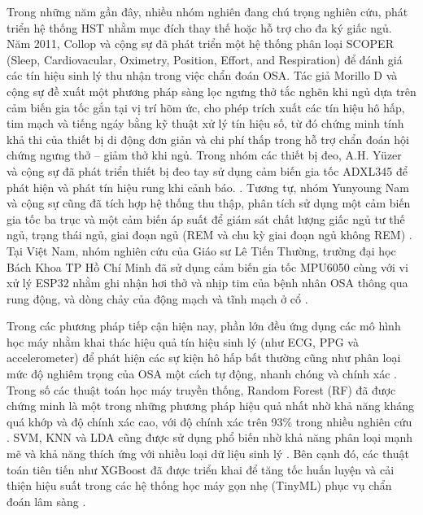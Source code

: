 Trong những năm gần đây, nhiều nhóm nghiên đang chú trọng nghiên cứu, phát
triển hệ thống HST nhằm mục đích thay thế hoặc hỗ trợ cho đa ký giấc ngủ. Năm
2011, Collop và cộng sự đã phát triển một hệ thống phân loại SCOPER (Sleep,
Cardiovacular, Oximetry, Position, Effort, and Respiration) để đánh giá các tín
hiệu sinh lý thu nhận trong việc chẩn đoán OSA\cite{hst_6p_paper}. Tác giả
Morillo D và cộng sự đề xuất một phương pháp sàng lọc ngưng thở tắc nghẽn khi
ngủ dựa trên cảm biến gia tốc gắn tại vị trí hõm ức, cho phép trích xuất các
tín hiệu hô hấp, tim mạch và tiếng ngáy bằng kỹ thuật xử lý tín hiệu số, từ đó
chứng minh tính khả thi của thiết bị di động đơn giản và chi phí thấp trong hỗ
trợ chẩn đoán hội chứng ngưng thở – giảm thở khi
ngủ\cite{morillo2010accelerometer}. Trong nhóm các thiết bị đeo, A.H. Yüzer và
cộng sự đã phát triển thiết bị đeo tay sử dụng cảm biến gia tốc ADXL345 để phát
hiện và phát tín hiệu rung khi cảnh báo. \cite{hst_wear_paper}. Tương tự, nhóm
Yunyoung Nam và cộng sự cũng đã tích hợp hệ thống thu thập, phân tích sử dụng
một cảm biến gia tốc ba trục và một cảm biến áp suất để giám sát chất lượng
giấc ngủ tư thế ngủ, trạng thái ngủ, giai đoạn ngủ (REM và chu kỳ giai đoạn ngủ
không REM) \cite{hst_pressure_paper}. Tại Việt Nam, nhóm nghiên cứu của Giáo sư
Lê Tiến Thường, trường đại học Bách Khoa TP Hồ Chí Minh đã sử dụng cảm biến gia
tốc MPU6050 cùng với vi xử lý ESP32 nhằm ghi nhận hơi thở và nhịp tim của bệnh
nhân OSA thông qua rung động, và dòng chảy của động mạch và tĩnh mạch ở cổ
\cite{thuong_wear_paper}.

Trong các phương pháp tiếp cận hiện nay, phần lớn đều ứng dụng các mô hình học
máy nhằm khai thác hiệu quả tín hiệu sinh lý (như ECG, PPG và accelerometer) để
phát hiện các sự kiện hô hấp bất thường cũng như phân loại mức độ nghiêm trọng
của OSA một cách tự động, nhanh chóng và chính xác \cite{osa_sanchez2025}.
Trong số các thuật toán học máy truyền thống, Random Forest (RF) đã được chứng
minh là một trong những phương pháp hiệu quả nhất nhờ khả năng kháng quá khớp
và độ chính xác cao, với độ chính xác trên 93\% trong nhiều nghiên cứu
\cite{genuer2020random,wang2023ml_wearable}. SVM, KNN và LDA cũng được sử dụng
phổ biến nhờ khả năng phân loại mạnh mẽ và khả năng thích ứng với nhiều loại dữ
liệu sinh lý \cite{cortes1995svm, cunningham2007knn, tharwat2017lda}. Bên cạnh
đó, các thuật toán tiên tiến như XGBoost đã được triển khai để tăng tốc huấn
luyện và cải thiện hiệu suất trong các hệ thống học máy gọn nhẹ (TinyML) phục
vụ chẩn đoán lâm sàng \cite{chen2016xgboost}.

